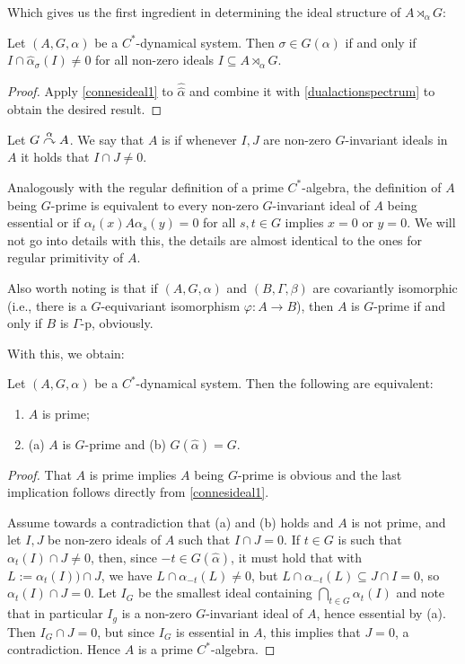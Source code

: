 Which gives us the first ingredient in determining the ideal structure of $A \rtimes_\alpha G$:
\begin{corollary}
	Let $(A,G,\alpha)$ be a $C^*$-dynamical system. Then $\sigma \in \hat G ( \alpha)$ if and only if $I \cap \hat \alpha_\sigma (I) \neq 0$ for all non-zero ideals $I \subseteq A \rtimes_\alpha G$.
	\label{olpe1.5.4}
\end{corollary}
\begin{proof}
	Apply \cref{connesideal1} to $\hat{ \hat{ \alpha}}$ and combine it with \cref{dualactionspectrum} to obtain the desired result.
\end{proof}
\begin{definition}
	 Let $G \stackrel{\alpha}{\curvearrowright} A$. We say that $A$ is  if whenever $I,J$ are non-zero $G$-invariant ideals in $A$ it holds that $I \cap J \neq 0$.
\end{definition}
\begin{remark}
	Analogously with the regular definition of a prime $C^*$-algebra, the definition of $A$ being $G$-prime is equivalent to every non-zero $G$-invariant ideal of $A$ being essential or if $\alpha_t(x) A \alpha_s(y)=0$ for all $s,t \in G$ implies $x = 0$ or $y = 0$. We will not go into details with this, the details are almost identical to the ones for regular primitivity of $A$.

	Also worth noting is that if $(A,G,\alpha)$ and $(B, \Gamma, \beta)$ are covariantly isomorphic (i.e., there is a $G$-equivariant isomorphism $\varphi \colon A \to B$), then $A$ is $G$-prime if and only if $B$ is $\Gamma$-p, obviously.
\end{remark}
With this, we obtain:
\begin{lemma}
	Let $(A,G,\alpha)$ be a $C^*$-dynamical system. Then the following are equivalent:
	\begin{enumerate}
		\item $A$ is prime;
		\item (a) $A$ is $G$-prime and (b) $G(\hat \alpha ) =G$.
	\end{enumerate}
	\label{olpe1.3.4}
\end{lemma}
\begin{proof}
	That $A$ is prime implies $A$ being $G$-prime is obvious and the last implication follows directly from \cref{connesideal1}.

	Assume towards a contradiction that (a) and (b) holds and $A$ is not prime, and let $I, J$ be non-zero ideals of $A$ such that $I \cap J = 0$. If $t \in G$ is such that $\alpha_t(I) \cap J \neq 0$, then, since $-t \in G(\hat \alpha)$, it must hold that with $L := \alpha_t(I)) \cap J$, we have $L \cap \alpha_{-t}(L) \neq 0$, but $L \cap \alpha_{-t}(L) \subseteq  J \cap I = 0$, so $\alpha_t(I) \cap J = 0$. Let $I_G$ be the smallest ideal containing $\bigcap_{t \in G} \alpha_t(I)$ and note that in particular $I_g$ is a non-zero $G$-invariant ideal of $A$, hence essential by (a). Then $I_G \cap J = 0$, but since $I_G$ is essential in $A$, this implies that $J = 0$, a contradiction. Hence $A$ is a prime $C^*$-algebra.
\end{proof}
